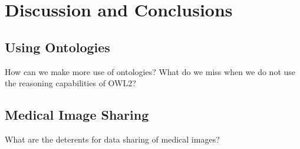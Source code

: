 
\chapter{Discussion and Conclusions} %

\label{Chapter6} %



\section{Using Ontologies}

How can we make more use of ontologies? What do we
miss when we do not use the reasoning capabilities of
OWL2?


\section{Medical Image Sharing}

What are the deterents for data sharing of medical
images?
